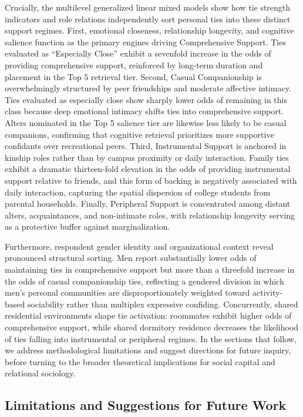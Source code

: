 \documentclass[12pt]{article}
\begin{document}
Crucially, the multilevel generalized linear mixed models show how tie strength indicators and role relations independently sort personal ties into these distinct support regimes. First, emotional closeness, relationship longevity, and cognitive salience function as the primary engines driving Comprehensive Support. Ties evaluated as ``Especially Close'' exhibit a sevenfold increase in the odds of providing comprehensive support, reinforced by long-term duration and placement in the Top 5 retrieval tier. Second, Casual Companionship is overwhelmingly structured by peer friendships and moderate affective intimacy. Ties evaluated as especially close show sharply lower odds of remaining in this class because deep emotional intimacy shifts ties into comprehensive support. Alters nominated in the Top 5 salience tier are likewise less likely to be casual companions, confirming that cognitive retrieval prioritizes more supportive confidants over recreational peers. Third, Instrumental Support is anchored in kinship roles rather than by campus proximity or daily interaction. Family ties exhibit a dramatic thirteen-fold elevation in the odds of providing instrumental support relative to friends, and this form of backing is negatively associated with daily interaction, capturing the spatial dispersion of college students from parental households. Finally, Peripheral Support is concentrated among distant alters, acquaintances, and non-intimate roles, with relationship longevity serving as a protective buffer against marginalization.

Furthermore, respondent gender identity and organizational context reveal pronounced structural sorting. Men report substantially lower odds of maintaining ties in comprehensive support but more than a threefold increase in the odds of casual companionship ties, reflecting a gendered division in which men's personal communities are disproportionately weighted toward activity-based sociability rather than multiplex expressive confiding. Concurrently, shared residential environments shape tie activation: roommates exhibit higher odds of comprehensive support, while shared dormitory residence decreases the likelihood of ties falling into instrumental or peripheral regimes. In the sections that follow, we address methodological limitations and suggest directions for future inquiry, before turning to the broader theoretical implications for social capital and relational sociology.

\subsection{Limitations and Suggestions for Future Work}
\end{document}
